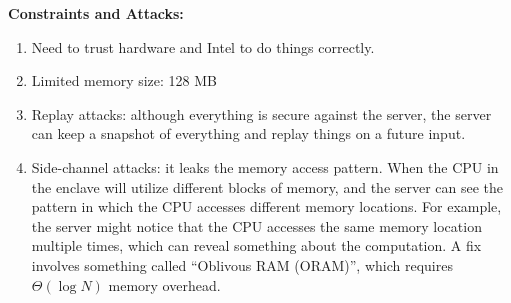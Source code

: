 \textbf{Constraints and Attacks:}

\begin{enumerate}
    \item Need to trust hardware and Intel to do things correctly.
    \item Limited memory size: 128 MB
    \item Replay attacks: although everything is secure against the server, the server can keep a snapshot of everything and replay things on a future input.
    \item Side-channel attacks: it leaks the memory access pattern. When the CPU in the enclave will utilize different blocks of memory, and the server can see the pattern in which the CPU accesses different memory locations. For example, the server might notice that the CPU accesses the same memory location multiple times, which can reveal something about the computation. A fix involves something called ``Oblivous RAM (ORAM)'', which requires $\Theta (\log N)$ memory overhead.
\end{enumerate}
